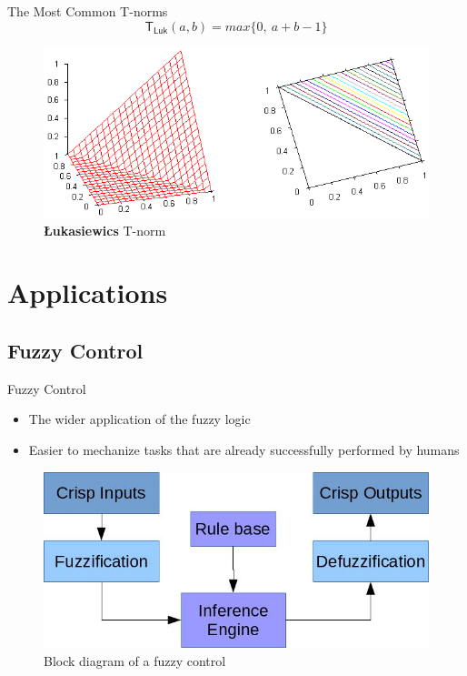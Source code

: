 \documentclass[hyperref={unicode}]{beamer}
\begin{document}
\begin{frame}{The Most Common T-norms}
	$$\mathsf{T_{Luk}}(a,b)=max\{0,\:a+b-1\}$$
	\begin{figure}
	\includegraphics[width=.95\textwidth]{luk-tnorm}
	\caption{\textbf{{\L}ukasiewics} T-norm}
	\end{figure}
\end{frame}


\section{Applications}


\subsection{Fuzzy Control}

\begin{frame}{Fuzzy Control}
	\begin{itemize}
	\item The wider application of the fuzzy logic \cite{lughofer2011evolving}
	\item Easier to mechanize tasks that are already successfully performed by humans
	\end{itemize}

	\begin{figure}
	\includegraphics[width=.75\textwidth]{fuzzy-control-block}
	\caption{Block diagram of a fuzzy control}
	\end{figure}
\end{frame}
\end{document}
